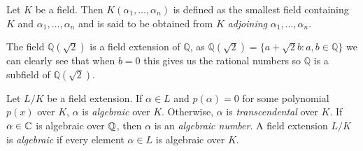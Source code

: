 \begin{definition}
    Let $K$ be a field. Then $K(\alpha_1, \dots, \alpha_n)$ is defined as the smallest field containing $K$ and $\alpha_1, \dots, \alpha_n$ and is said to be obtained from $K$ \textit{adjoining} $\alpha_1, \dots, \alpha_n$. 
\end{definition}

\begin{example}
The field \(\mathbb{Q}(\sqrt{2})\) is a field extension of \(\mathbb{Q}\), as \(\mathbb{Q}(\sqrt{2}) = \{a + \sqrt{2}b : a,b \in \mathbb{Q}\}\) we can clearly see that when \(b = 0\) this gives us the rational numbers so \(\mathbb{Q}\) is a subfield of \(\mathbb{Q}(\sqrt{2})\).
\end{example}






\begin{definition}
Let $L/K$ be a field extension. If \(\alpha \in L\) and \(p(\alpha)=0\) for some polynomial \(p(x)\) over \(K\), \(\alpha\) is \textit{algebraic} over $K$. Otherwise, \(\alpha\) is \textit{transcendental} over \(K\). If $\alpha \in \mathbb C$ is algebraic over $\mathbb Q$, then $\alpha$ is an \textit{algebraic number}.     A field extension $L/K$ is \textit{algebraic} if every element $\alpha \in L$ is algebraic over $K$. 
\end{definition}









